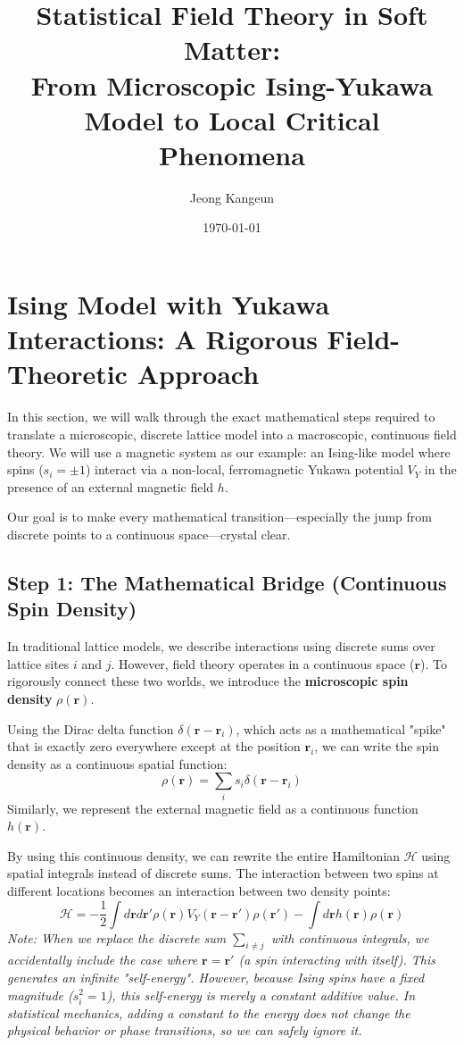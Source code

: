 \documentclass[12pt,a4paper]{article}
\title{Statistical Field Theory in Soft Matter:\\ From Microscopic Ising-Yukawa Model to Local Critical Phenomena}
\author{Jeong Kangeun}
\date{\today}
\begin{document}
\maketitle

\section{Ising Model with Yukawa Interactions: A Rigorous Field-Theoretic Approach}

In this section, we will walk through the exact mathematical steps required to translate a microscopic, discrete lattice model into a macroscopic, continuous field theory. We will use a magnetic system as our example: an Ising-like model where spins ($s_i = \pm 1$) interact via a non-local, ferromagnetic Yukawa potential $V_Y$ in the presence of an external magnetic field $h$. 

Our goal is to make every mathematical transition—especially the jump from discrete points to a continuous space—crystal clear.

\subsection{Step 1: The Mathematical Bridge (Continuous Spin Density)}
In traditional lattice models, we describe interactions using discrete sums over lattice sites $i$ and $j$. However, field theory operates in a continuous space ($\mathbf{r}$). To rigorously connect these two worlds, we introduce the \textbf{microscopic spin density} $\rho(\mathbf{r})$. 

Using the Dirac delta function $\delta(\mathbf{r} - \mathbf{r}_i)$, which acts as a mathematical "spike" that is exactly zero everywhere except at the position $\mathbf{r}_i$, we can write the spin density as a continuous spatial function:
\begin{equation}
    \rho(\mathbf{r}) = \sum_i s_i \delta(\mathbf{r} - \mathbf{r}_i)
\end{equation}
Similarly, we represent the external magnetic field as a continuous function $h(\mathbf{r})$.

By using this continuous density, we can rewrite the entire Hamiltonian $\mathcal{H}$ using spatial integrals instead of discrete sums. The interaction between two spins at different locations becomes an interaction between two density points:
\begin{equation}
    \mathcal{H} = -\frac{1}{2} \int d\mathbf{r} d\mathbf{r}' \rho(\mathbf{r}) V_Y(\mathbf{r} - \mathbf{r}') \rho(\mathbf{r}') - \int d\mathbf{r} h(\mathbf{r}) \rho(\mathbf{r})
\end{equation}
\textit{Note: When we replace the discrete sum $\sum_{i \neq j}$ with continuous integrals, we accidentally include the case where $\mathbf{r} = \mathbf{r}'$ (a spin interacting with itself). This generates an infinite "self-energy". However, because Ising spins have a fixed magnitude ($s_i^2 = 1$), this self-energy is merely a constant additive value. In statistical mechanics, adding a constant to the energy does not change the physical behavior or phase transitions, so we can safely ignore it.}
\end{document}
